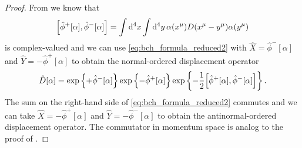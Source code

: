 \begin{proof}
	From  we know that
	\begin{equation*}
		\comm{\hat\phi^+[\alpha]}{\hat\phi^-[\alpha]}
		=
		\int\dd[4]{x}
		\int\dd[4]{y}
		\alpha(x^\mu)
		D(x^\mu-y^\mu)
		\alpha(y^\mu)
	\end{equation*}
	is complex-valued and we can use \cref{eq:bch_formula_reduced2} with $\hat{X}=\hat\phi^-[\alpha]$ and $\hat{Y}=-\hat\phi^+[\alpha]$ to obtain the normal-ordered displacement operator
	\begin{equation*}
		\hat{D}[\alpha]
		=
		\exp\left\{
			+
			\hat\phi^-[\alpha]
		\right\}
		\exp\left\{
			-
			\hat\phi^+[\alpha]
		\right\}
		\exp\left\{
			-
			\frac{1}{2}
			\comm{\hat\phi^+[\alpha]}{\hat\phi^-[\alpha]}
		\right\}
		.
	\end{equation*}
	The sum on the right-hand side of \cref{eq:bch_formula_reduced2} commutes and we can take $\hat{X}=-\hat\phi^+[\alpha]$ and $\hat{Y}=-\hat\phi^-[\alpha]$ to obtain the antinormal-ordered displacement operator.
	The commutator in momentum space is analog to the proof of .
\end{proof}

